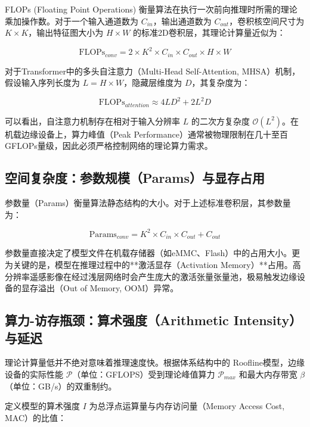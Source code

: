 FLOPs (Floating Point Operations) 衡量算法在执行一次前向推理时所需的理论乘加操作数。对于一个输入通道数为 $C_{in}$，输出通道数为 $C_{out}$，卷积核空间尺寸为 $K \times K$，输出特征图大小为 $H \times W$ 的标准2D卷积层，其理论计算量近似为：

\begin{equation}
\text{FLOPs}_{conv} = 2 \times K^2 \times C_{in} \times C_{out} \times H \times W
\end{equation}

对于Transformer中的多头自注意力（Multi-Head Self-Attention, MHSA）机制，假设输入序列长度为 $L = H \times W$，隐藏层维度为 $D$，其复杂度为：

\begin{equation}
\text{FLOPs}_{attention} \approx 4 L D^2 + 2 L^2 D
\end{equation}

可以看出，自注意力机制存在相对于输入分辨率 $L$ 的二次方复杂度 $\mathcal{O}(L^2)$。在机载边缘设备上，算力峰值（Peak Performance）通常被物理限制在几十至百GFLOPs量级，因此必须严格控制网络的理论算力需求。

\subsection{空间复杂度：参数规模（Params）与显存占用}

参数量（Params）衡量算法静态结构的大小。对于上述标准卷积层，其参数量为：

\begin{equation}
\text{Params}_{conv} = K^2 \times C_{in} \times C_{out} + C_{out}
\end{equation}

参数量直接决定了模型文件在机载存储器（如eMMC、Flash）中的占用大小。更为关键的是，模型在推理过程中的**激活显存（Activation Memory）**占用。高分辨率遥感影像在经过浅层网络时会产生庞大的激活张量张量池，极易触发边缘设备的显存溢出（Out of Memory, OOM）异常。

\subsection{算力-访存瓶颈：算术强度（Arithmetic Intensity）与延迟}

理论计算量低并不绝对意味着推理速度快。根据体系结构中的 Roofline模型，边缘设备的实际性能 $\mathcal{P}$（单位：GFLOPS）受到理论峰值算力 $\mathcal{P}_{max}$ 和最大内存带宽 $\beta$（单位：GB/s）的双重制约。

定义模型的算术强度 $I$ 为总浮点运算量与内存访问量（Memory Access Cost, MAC）的比值：


